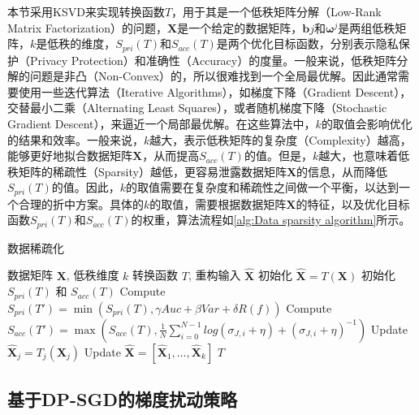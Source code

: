 本节采用KSVD\cite{Deep_KSVD_Denoising}来实现转换函数$T$，用于其是一个低秩矩阵分解（Low-Rank Matrix Factorization）的问题，$\mathbf{X}$是一个给定的数据矩阵，$\boldsymbol{b}{j}$和$\boldsymbol{\omega}^{j}$是两组低秩矩阵，$k$是低秩的维度，$S_{pri}(T)$和$S_{acc}(T)$是两个优化目标函数，分别表示隐私保护（Privacy Protection）和准确性（Accuracy）的度量。一般来说，低秩矩阵分解的问题是非凸（Non-Convex）的，所以很难找到一个全局最优解。因此通常需要使用一些迭代算法（Iterative Algorithms），如梯度下降（Gradient Descent），交替最小二乘（Alternating Least Squares），或者随机梯度下降（Stochastic Gradient Descent），来逼近一个局部最优解。在这些算法中，$k$的取值会影响优化的结果和效率。一般来说，$k$越大，表示低秩矩阵的复杂度（Complexity）越高，能够更好地拟合数据矩阵$\mathbf{X}$，从而提高$S_{acc}(T)$的值。但是，$k$越大，也意味着低秩矩阵的稀疏性（Sparsity）越低，更容易泄露数据矩阵$\mathbf{X}$的信息，从而降低$S_{pri}(T)$的值。因此，$k$的取值需要在复杂度和稀疏性之间做一个平衡，以达到一个合理的折中方案。具体的$k$的取值，需要根据数据矩阵$\mathbf{X}$的特征，以及优化目标函数$S_{pri}(T)$和$S_{acc}(T)$的权重，算法流程如\ref{alg:Data sparsity algorithm}所示。

\begin{algorithm}[!th]
\caption{数据稀疏化}
\label{alg:Data sparsity algorithm}
\begin{algorithmic}[1]
    \REQUIRE 
        数据矩阵 $\mathbf{X}$, 低秩维度 $k$
    \ENSURE 
        转换函数 $T$, 重构输入 $\widehat{\mathbf{X}}$
    \STATE 初始化 $\widehat{\mathbf{X}} = T(\mathbf{X})$
    \STATE 初始化 $S_{pri}(T)$ 和 $S_{acc}(T)$
    \REPEAT
        \STATE Compute $S_{pri}(T')=\min(S_{pri}(T),\gamma{Auc}+\beta{Var}+\delta R(f))$
        \STATE Compute $S_{acc}(T')=\max(S_{acc}(T),\frac{1}{N}\sum _{i=0}^{N-1} {log(\sigma _{J,i} + \eta) + (\sigma _{J,i} + \eta)^{-1}})$
        \STATE Update $\widehat{\mathbf{X}}_j = T_j(\mathbf{X}_j)$
        \ENDFOR
        \STATE Update $\widehat{\mathbf{X}} = [\widehat{\mathbf{X}}_1, \dots, \widehat{\mathbf{X}}_k]$
    \RETURN $T$
    \end{algorithmic}
\end{algorithm}

\subsection{基于DP-SGD的梯度扰动策略}

